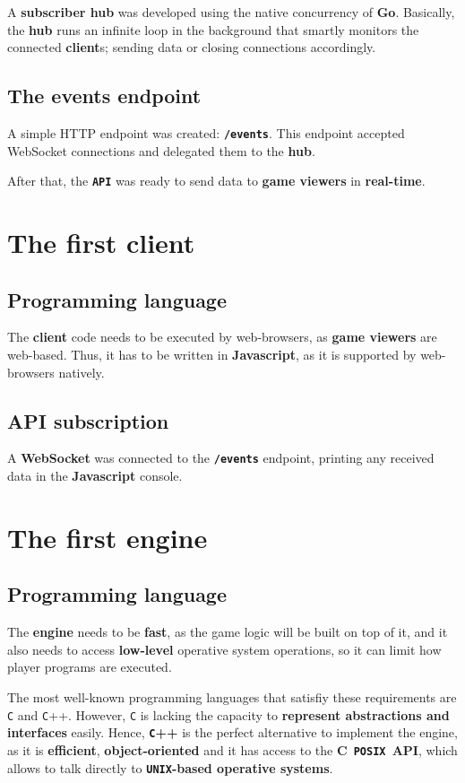 \documentclass[a4paper,11pt,titlepage,abstract,numbers=noenddot,automark,mnsy,intlimits,rgb,dvipsnames]{report}
\begin{document}
A \textbf{subscriber hub} was developed using the native concurrency of \textbf{Go}. Basically, the \textbf{hub} runs an infinite loop in the
background that smartly monitors the connected \textbf{client}s; sending data or closing connections accordingly.
\subsection{The events endpoint}
A simple HTTP endpoint was created: \textbf{\texttt{/events}}. This endpoint accepted WebSocket connections and delegated them to the
\textbf{hub}.

After that, the \textbf{\texttt{API}} was ready to send data to \textbf{game viewers} in \textbf{real-time}.
\section{The first client}
\subsection{Programming language}
The \textbf{client} code needs to be executed by web-browsers, as \textbf{game viewers} are web-based.
Thus, it has to be written in \textbf{Javascript}, as it is supported by web-browsers natively.
\subsection{API subscription}
A \textbf{WebSocket} was connected to the \textbf{\texttt{/events}} endpoint, printing any received data in the \textbf{Javascript} console.
\section{The first engine}
\subsection{Programming language}
The \textbf{engine} needs to be \textbf{fast}, as the game logic will be built on top of it, and it also needs to access
\textbf{low-level} operative system operations, so it can limit how player programs are executed.

The most well-known programming languages that satisfiy these requirements are \texttt{C} and \texttt{C}++. However, \texttt{C}  is lacking
the capacity to \textbf{represent abstractions and interfaces} easily. Hence, \textbf{\texttt{C}++} is the perfect alternative to implement
the engine, as it is \textbf{efficient}, \textbf{object-oriented} and it has access to the \textbf{\texttt{}C\texttt{ POSIX }API\texttt{}}, which allows to talk
directly to \textbf{\texttt{UNIX}-based operative systems}.
\end{document}
